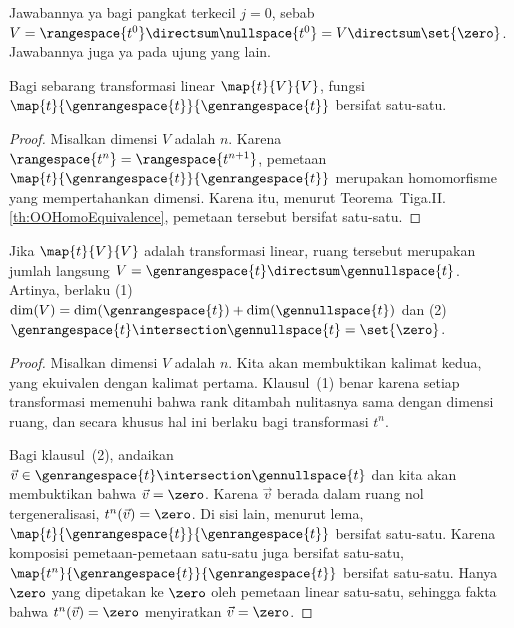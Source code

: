 Jawabannya ya bagi pangkat terkecil $j=0$, sebab
\( V=\rangespace{t^0}\directsum\nullspace{t^0}=V\directsum\set{\zero} \).
Jawabannya juga ya pada ujung yang lain.

\begin{lemma} \label{lem:RestONeToOne}
Bagi sebarang transformasi linear \( \map{t}{V}{V} \), fungsi
\( \map{t}{\genrangespace{t}}{\genrangespace{t}} \) bersifat satu-satu.
\end{lemma}

\begin{proof}
Misalkan dimensi $V$ adalah $n$.
Karena \( \rangespace{t^n}=\rangespace{t^{n+1}} \), pemetaan
\( \map{t}{\genrangespace{t}}{\genrangespace{t}} \) merupakan homomorfisme
yang mempertahankan dimensi.
Karena itu, menurut Teorema~Tiga.II.\ref{th:OOHomoEquivalence}, pemetaan tersebut
bersifat satu-satu.
\end{proof}

\begin{corollary} \label{GenRngNullDirSumToSp}
Jika \( \map{t}{V}{V} \) adalah transformasi linear, ruang tersebut merupakan
jumlah langsung
\( V=\genrangespace{t}\directsum\gennullspace{t} \).
Artinya, berlaku (1)~\( \dim(V)=\dim(\genrangespace{t})+\dim(\gennullspace{t}) \)
dan (2)~\( \genrangespace{t}\intersection\gennullspace{t}=\set{\zero} \).
\end{corollary}

\begin{proof}
Misalkan dimensi $V$ adalah $n$.
Kita akan membuktikan kalimat kedua, yang ekuivalen dengan kalimat pertama.
Klausul~(1) benar karena setiap transformasi memenuhi bahwa rank ditambah
nulitasnya sama dengan dimensi ruang, dan secara khusus hal ini berlaku bagi
transformasi $t^n$.

Bagi klausul~(2), andaikan
\( \vec{v}\in\genrangespace{t}\intersection\gennullspace{t} \)
dan kita akan membuktikan bahwa $\vec{v}=\zero$.
Karena \( \vec{v} \) berada dalam ruang nol tergeneralisasi,
\( t^n(\vec{v})=\zero \).
Di sisi lain, menurut lema,
\( \map{t}{\genrangespace{t}}{\genrangespace{t}} \)
bersifat satu-satu. Karena komposisi pemetaan-pemetaan satu-satu juga bersifat
satu-satu, \( \map{t^n}{\genrangespace{t}}{\genrangespace{t}} \) bersifat
satu-satu.
Hanya \( \zero \) yang dipetakan ke \( \zero \) oleh pemetaan linear
satu-satu, sehingga fakta bahwa \( t^n(\vec{v})=\zero \) menyiratkan
\( \vec{v}=\zero \).
\end{proof}

